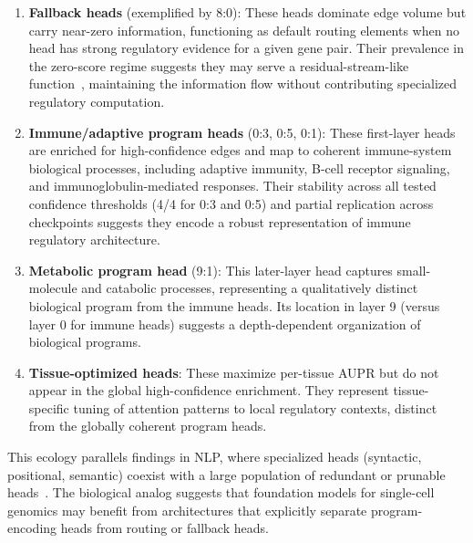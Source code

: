 \documentclass[11pt]{article}
\begin{document}
\begin{enumerate}
\item \textbf{Fallback heads} (exemplified by 8:0): These heads dominate edge volume but carry near-zero information, functioning as default routing elements when no head has strong regulatory evidence for a given gene pair. Their prevalence in the zero-score regime suggests they may serve a residual-stream-like function~\cite{elhage2022toy}, maintaining the information flow without contributing specialized regulatory computation.

\item \textbf{Immune/adaptive program heads} (0:3, 0:5, 0:1): These first-layer heads are enriched for high-confidence edges and map to coherent immune-system biological processes, including adaptive immunity, B-cell receptor signaling, and immunoglobulin-mediated responses. Their stability across all tested confidence thresholds (4/4 for 0:3 and 0:5) and partial replication across checkpoints suggests they encode a robust representation of immune regulatory architecture.

\item \textbf{Metabolic program head} (9:1): This later-layer head captures small-molecule and catabolic processes, representing a qualitatively distinct biological program from the immune heads. Its location in layer 9 (versus layer 0 for immune heads) suggests a depth-dependent organization of biological programs.

\item \textbf{Tissue-optimized heads}: These maximize per-tissue AUPR but do not appear in the global high-confidence enrichment. They represent tissue-specific tuning of attention patterns to local regulatory contexts, distinct from the globally coherent program heads.
\end{enumerate}

This ecology parallels findings in NLP, where specialized heads (syntactic, positional, semantic) coexist with a large population of redundant or prunable heads~\cite{voita2019heads,michel2019sixteen}. The biological analog suggests that foundation models for single-cell genomics may benefit from architectures that explicitly separate program-encoding heads from routing or fallback heads.
\end{document}
